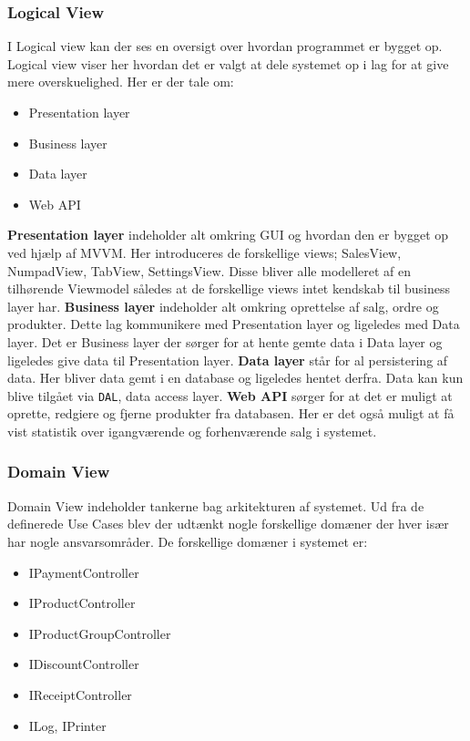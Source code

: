 \subsubsection{Logical View}
I Logical view kan der ses en oversigt over hvordan programmet er bygget op. Logical view viser her hvordan det er valgt at dele systemet op i lag for at give mere overskuelighed. Her er der tale om:
\begin{itemize}
	\item Presentation layer
	\item Business layer
	\item Data layer
	\item Web API
\end{itemize}
 
\textbf{Presentation layer} indeholder alt omkring GUI og hvordan den er bygget op ved hjælp af MVVM. Her introduceres de forskellige views; SalesView, NumpadView, TabView, SettingsView. Disse bliver alle modelleret af en tilhørende Viewmodel således at de forskellige views intet kendskab til business layer har. \textbf{Business layer} indeholder alt omkring oprettelse af salg, ordre og produkter. Dette lag kommunikere med Presentation layer og ligeledes med Data layer. Det er Business layer der sørger for at hente gemte data i Data layer og ligeledes give data til Presentation layer.\newline
\textbf{Data layer} står for al persistering af data. Her bliver data gemt i en database og ligeledes hentet derfra. Data kan kun blive tilgået via \texttt{DAL}, data access layer.\newline
\textbf{Web API} sørger for at det er muligt at oprette, redgiere og fjerne produkter fra databasen. Her er det også muligt at få vist statistik over igangværende og forhenværende salg i systemet. 

\subsubsection{Domain View}
Domain View indeholder tankerne bag arkitekturen af systemet. Ud fra de definerede Use Cases blev der udtænkt nogle forskellige domæner der hver især har nogle ansvarsområder.\newline
De forskellige domæner i systemet er:\newline
\begin{itemize}
	\item IPaymentController
	\item IProductController
	\item IProductGroupController
	\item IDiscountController
	\item IReceiptController
	\item ILog, IPrinter
\end{itemize}	

